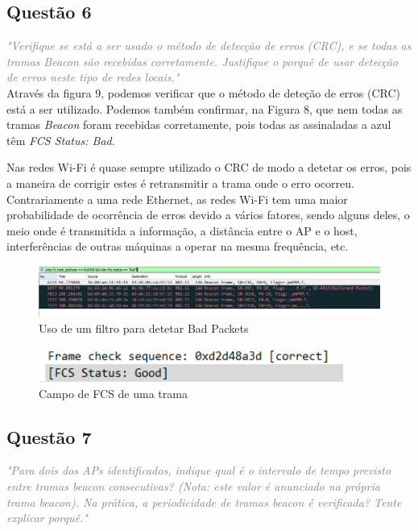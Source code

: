 \documentclass{llncs}
\newcommand{\questionE}[1]{\textcolor{gray}{\textit{"#1"}}}
\begin{document}
\subsection*{Questão 6}
\hspace{3mm} 
\questionE{Verifique se está a ser usado o método de detecção de erros (CRC), e se todas as tramas Beacon são recebidas corretamente. Justifique o porquê de usar detecção de erros neste tipo de redes locais.}\\ 

Através da figura 9, podemos verificar que o método de deteção de erros (CRC) está a ser utilizado. Podemos também confirmar, na Figura 8, que nem todas as tramas \textit{Beacon} foram recebidas corretamente, pois todas as assinaladas a azul têm \textit{FCS Status: Bad}.

Nas redes Wi-Fi é quase sempre utilizado o CRC de modo a detetar os erros, pois a maneira de corrigir estes é retransmitir a trama onde o erro ocorreu. Contrariamente a uma rede Ethernet, as redes Wi-Fi tem uma maior probabilidade de ocorrência de erros devido a vários fatores, sendo alguns deles, o meio onde é transmitida a informação, a distância entre o AP e o host, interferências de outras máquinas a operar na mesma frequência, etc. 

\begin{figure}[H]
\begin{center}
\includegraphics[width=13cm]{6.PNG}
\end{center}
\caption{Uso de um filtro para detetar Bad Packets}
\end{figure}

\begin{figure}[H]
\begin{center}
\includegraphics[width=10cm]{6a.PNG}
\end{center}
\caption{Campo de FCS de uma trama}
\end{figure}

\subsection*{Questão 7}
\hspace{3mm} 
\questionE{Para dois dos APs identificados, indique qual é o intervalo de tempo previsto entre tramas beacon consecutivas? (Nota: este valor é anunciado na própria trama beacon). Na prática, a periodicidade de tramas beacon é verificada? Tente explicar porquê.}\\  
\end{document}
